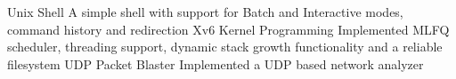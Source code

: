 \begin{cvskills}
  \cvskill
    {Unix Shell}
    {A simple shell with support for Batch and Interactive 
     modes, command history and redirection}
  \cvskill
    {Xv6 Kernel Programming}
    {Implemented MLFQ scheduler, threading support, dynamic stack growth 
     functionality and a reliable filesystem}
  \cvskill
    {UDP Packet Blaster}
    {Implemented a UDP based network analyzer}
\end{cvskills}
